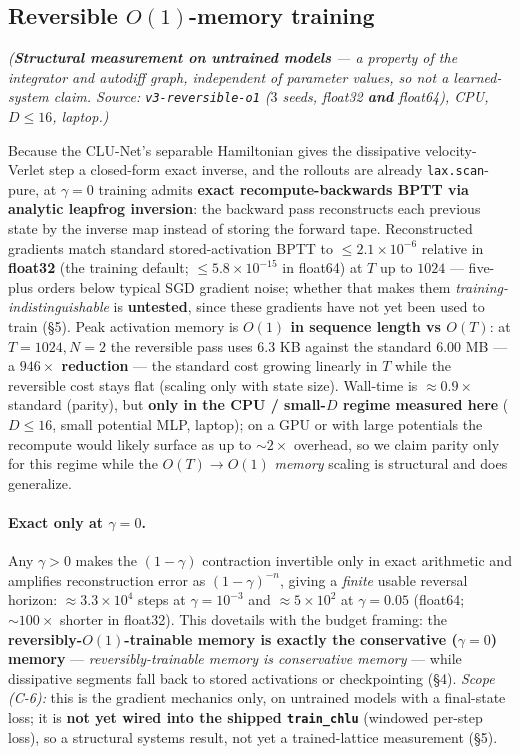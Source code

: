 \documentclass[11pt]{article}
\begin{document}
\subsection{Reversible $O(1)$-memory training}
\emph{(\textbf{Structural measurement on untrained models} --- a property of the integrator and autodiff graph, independent of parameter values, so not a learned-system claim. Source: \texttt{v3-reversible-o1} ($3$ seeds, float32 \textbf{and} float64), CPU, $D\le16$, laptop.)}

Because the CLU-Net's separable Hamiltonian gives the dissipative velocity-Verlet step a closed-form exact inverse, and the rollouts are already \texttt{lax.scan}-pure, at $\gamma=0$ training admits \textbf{exact recompute-backwards BPTT via analytic leapfrog inversion}: the backward pass reconstructs each previous state by the inverse map instead of storing the forward tape. Reconstructed gradients match standard stored-activation BPTT to $\le2.1\times10^{-6}$ relative in \textbf{float32} (the training default; $\le5.8\times10^{-15}$ in float64) at $T$ up to $1024$ --- five-plus orders below typical SGD gradient noise; whether that makes them \emph{training-indistinguishable} is \textbf{untested}, since these gradients have not yet been used to train (\S5). Peak activation memory is \textbf{$O(1)$ in sequence length vs $O(T)$}: at $T=1024,N=2$ the reversible pass uses $6.3$ KB against the standard $6.00$ MB --- a \textbf{$946\times$ reduction} --- the standard cost growing linearly in $T$ while the reversible cost stays flat (scaling only with state size). Wall-time is $\approx0.9\times$ standard (parity), but \textbf{only in the CPU / small-$D$ regime measured here} ($D\le16$, small potential MLP, laptop); on a GPU or with large potentials the recompute would likely surface as up to $\sim2\times$ overhead, so we claim parity only for this regime while the $O(T)\!\to\!O(1)$ \emph{memory} scaling is structural and does generalize.

\paragraph{Exact only at $\gamma=0$.} Any $\gamma>0$ makes the $(1-\gamma)$ contraction invertible only in exact arithmetic and amplifies reconstruction error as $(1-\gamma)^{-n}$, giving a \emph{finite} usable reversal horizon: $\approx3.3\times10^{4}$ steps at $\gamma=10^{-3}$ and $\approx5\times10^{2}$ at $\gamma=0.05$ (float64; $\sim100\times$ shorter in float32). This dovetails with the budget framing: the \textbf{reversibly-$O(1)$-trainable memory is exactly the conservative ($\gamma=0$) memory} --- \emph{reversibly-trainable memory is conservative memory} --- while dissipative segments fall back to stored activations or checkpointing (\S4). \emph{Scope (C-6):} this is the gradient mechanics only, on untrained models with a final-state loss; it is \textbf{not yet wired into the shipped \texttt{train\_chlu}} (windowed per-step loss), so a structural systems result, not yet a trained-lattice measurement (\S5).
\end{document}
